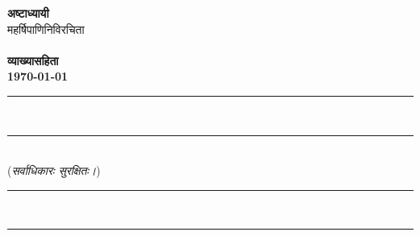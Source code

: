 \begin{center}
{\la
\vspace*{20mm}
{\Huge \textbf{अष्टाध्यायी}}\\
\vspace{10mm}
{\Large महर्षिपाणिनिविरचिता}\\[10mm]
\sectionrule[.1\linewidth]\\
\vspace{10mm}
{\large \textbf{व्याख्यासहिता}}\\
\vspace{20mm}
\textbf{\today}
}
\end{center}
\newpage

\vspace*{\fill}
\begin{center}
{\la
\rule{\linewidth}{3pt}\\
\vspace{-5mm}
\rule{\linewidth}{.5pt}\\
({\itshape सर्वाधिकारः सुरक्षितः।})\\
\rule{\linewidth}{.5pt}\\
\vspace{-4mm}
\rule{\linewidth}{3pt}
}
\end{center}
\vspace*{\fill}
\newpage
